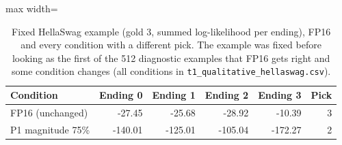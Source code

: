 \begin{table}[!htb]
\centering
\scriptsize
\setlength{\tabcolsep}{3.5pt}
\caption{Fixed HellaSwag example (gold 3, summed log-likelihood per ending), FP16 and every condition with a different pick. The example was fixed before looking as the first of the 512 diagnostic examples that FP16 gets right and some condition changes (all conditions in \texttt{t1\_qualitative\_hellaswag.csv}).}
\label{tab:t1qualshort}
\begin{adjustbox}{max width=\linewidth}
\begin{tabular}{lrrrrr}
\toprule
Condition & Ending 0 & Ending 1 & Ending 2 & Ending 3 & Pick \\
\midrule
FP16 (unchanged) & -27.45 & -25.68 & -28.92 & -10.39 & 3 \\
P1 magnitude 75\% & -140.01 & -125.01 & -105.04 & -172.27 & 2 \\
\bottomrule
\end{tabular}
\end{adjustbox}
\end{table}
